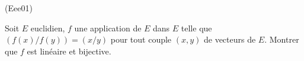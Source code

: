 \begin{tiny}(Eee01)\end{tiny}
Soit $E$ euclidien, $f$ une application de $E$ dans $E$ telle que $(f(x)/ f(y))=(x/ y)$ pour tout couple $(x,y)$ de vecteurs de $E$. Montrer que $f$ est lin{\'e}aire et bijective.
